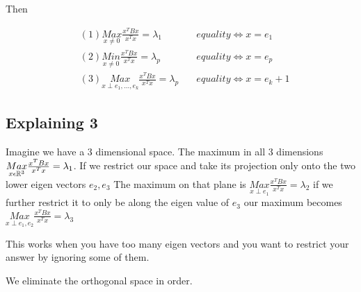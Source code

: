 Then

\begin{align*}
    &(1) \underset{x\neq 0}{Max}\frac{x^TBx}{x^Tx} = \lambda_1 \quad & equality\Leftrightarrow x=e_1 \\
    &(2) \underset{x\neq 0}{Min}\frac{x^TBx}{x^Tx} = \lambda_p \quad & equality\Leftrightarrow x=e_p\\
    &(3) \underset{x\perp e_1,...,e_k}{Max}\frac{x^TBx}{x^Tx} = \lambda_p \quad & equality\Leftrightarrow x=e_k+1
\end{align*}

\subsection{Explaining 3}

Imagine we have a 3 dimensional space. The maximum in all 3 dimensions $\underset{x\epsilon \mathbb{R}^3}{Max}\frac{x^TBx}{x^Tx} = \lambda_1$. If we restrict our space and take its projection only onto the two lower eigen vectors $e_2,e_3$ The maximum on that plane is $\underset{x\perp e_1}{Max}\frac{x^TBx}{x^Tx} = \lambda_2$ if we further restrict it to only be along the eigen value of $e_3$ our maximum becomes$\underset{x\perp e_1,e_2}{Max}\frac{x^TBx}{x^Tx} = \lambda_3$

This works when you have too many eigen vectors and you want to restrict your answer by ignoring some of them.

We eliminate the orthogonal space in order.

